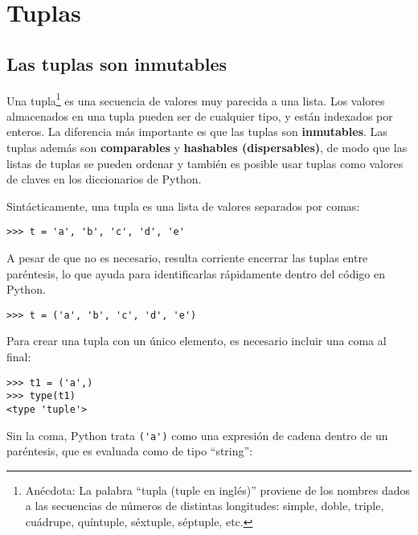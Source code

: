 
\chapter{Tuplas}
\label{tuplechap}

\section{Las tuplas son inmutables}


Una tupla\footnote{Anécdota: La palabra ``tupla (tuple en inglés)'' proviene de los nombres
dados a las secuencias de números de distintas longitudes: simple,
doble, triple, cuádrupe, quíntuple, séxtuple, séptuple, etc.}
es una secuencia de valores muy parecida a una lista.
Los valores almacenados en una tupla pueden ser de cualquier tipo, y
están indexados por enteros.
La diferencia más importante es que las tuplas son {\bf inmutables}.
Las tuplas además son {\bf comparables} y {\bf hashables (dispersables)}, de modo que
las listas de tuplas se pueden ordenar y también es posible usar tuplas
como valores de claves en los diccionarios de Python.


Sintácticamente, una tupla es una lista de valores separados por comas:

\beforeverb
\begin{verbatim}
>>> t = 'a', 'b', 'c', 'd', 'e'
\end{verbatim}
\afterverb
%
A pesar de que no es necesario, resulta corriente encerrar las tuplas entre
paréntesis, lo que ayuda para identificarlas rápidamente dentro del
código en Python.


\beforeverb
\begin{verbatim}
>>> t = ('a', 'b', 'c', 'd', 'e')
\end{verbatim}
\afterverb
%
Para crear una tupla con un único elemento, es necesario incluir una coma
al final:


\beforeverb
\begin{verbatim}
>>> t1 = ('a',)
>>> type(t1)
<type 'tuple'>
\end{verbatim}
\afterverb
%
Sin la coma, Python trata \verb"('a')" como una expresión
de cadena dentro de un paréntesis, que es evaluada como de tipo ``string'':

